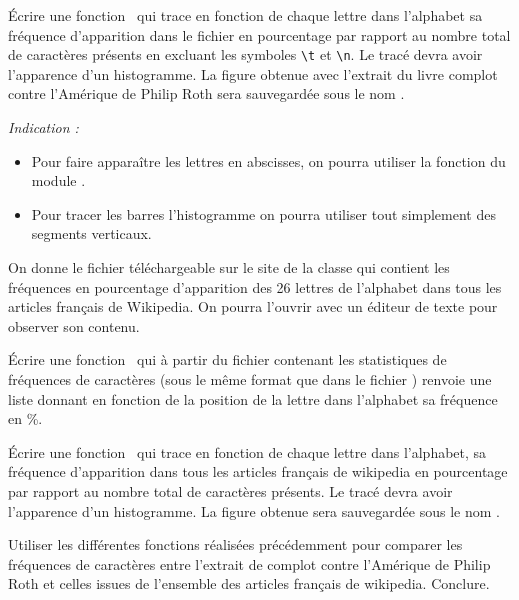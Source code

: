 \question{ } \'Ecrire une fonction \python\,  qui trace en fonction de chaque lettre dans l'alphabet sa fréquence d'apparition dans le fichier  en pourcentage par rapport au nombre total de caractères présents en excluant les symboles \texttt{\textbackslash t} et \texttt{\textbackslash n}. Le tracé devra avoir l'apparence d'un histogramme. La figure obtenue avec l'extrait du livre complot contre l'Amérique de Philip Roth sera sauvegardée sous le nom .

\emph{Indication :}  


\begin{itemize}
\item Pour faire apparaître les lettres en abscisses, on pourra utiliser la fonction  du module .
\item Pour tracer les barres l'histogramme on pourra utiliser tout simplement des segments verticaux. 
\end{itemize}

On donne le fichier  téléchargeable sur le site de la classe qui contient les fréquences en pourcentage d'apparition des 26 lettres de l'alphabet dans tous les articles français de Wikipedia. On pourra l'ouvrir avec un éditeur de texte pour observer son contenu.

\question{} \'Ecrire une fonction \python\,  qui à partir du fichier  contenant les statistiques de fréquences de caractères (sous le même format que dans le fichier ) renvoie une liste donnant en fonction de la position de la lettre dans l'alphabet sa fréquence en \%.

\question{ } \'Ecrire une fonction \python\,  qui trace en fonction de chaque lettre dans l'alphabet, sa fréquence d'apparition dans tous les articles français de wikipedia en pourcentage par rapport au nombre total de caractères présents. Le tracé devra avoir l'apparence d'un histogramme. La figure obtenue sera sauvegardée sous le nom .

\question{} Utiliser les différentes fonctions réalisées précédemment pour comparer les fréquences de caractères entre l'extrait de complot contre l'Amérique de Philip Roth et celles issues de l'ensemble des articles français de wikipedia. Conclure. 



